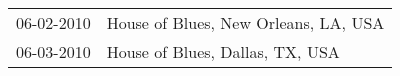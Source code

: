 \begin{supertabular}{ll}
 06-02-2010 &  House of Blues, New Orleans, LA, USA \\
 06-03-2010 &       House of Blues, Dallas, TX, USA \\
\end{supertabular}
